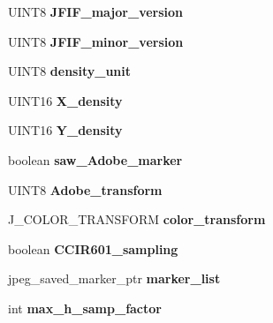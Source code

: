 \begin{DoxyCompactItemize}
U\+I\+N\+T8 {\bfseries J\+F\+I\+F\+\_\+major\+\_\+version}
\item 
\mbox{\label{structjpeg__decompress__struct_a75a27a410717002a2ec2f339a9142824}} 
U\+I\+N\+T8 {\bfseries J\+F\+I\+F\+\_\+minor\+\_\+version}
\item 
\mbox{\label{structjpeg__decompress__struct_a8d4afa82a43e8a7452b5e4f8276bbdb7}} 
U\+I\+N\+T8 {\bfseries density\+\_\+unit}
\item 
\mbox{\label{structjpeg__decompress__struct_a69f0da1031f16c621438d123921ba745}} 
U\+I\+N\+T16 {\bfseries X\+\_\+density}
\item 
\mbox{\label{structjpeg__decompress__struct_a2bfa78f638ae718f6601fd64a3b9f7aa}} 
U\+I\+N\+T16 {\bfseries Y\+\_\+density}
\item 
\mbox{\label{structjpeg__decompress__struct_aa117f97eb92feac14f6f91b599f1928c}} 
boolean {\bfseries saw\+\_\+\+Adobe\+\_\+marker}
\item 
\mbox{\label{structjpeg__decompress__struct_aebe0766b99c4fbe0e8b2a78e5e91d107}} 
U\+I\+N\+T8 {\bfseries Adobe\+\_\+transform}
\item 
\mbox{\label{structjpeg__decompress__struct_a976c199570f66a35853ad08dac014bc3}} 
J\+\_\+\+C\+O\+L\+O\+R\+\_\+\+T\+R\+A\+N\+S\+F\+O\+RM {\bfseries color\+\_\+transform}
\item 
\mbox{\label{structjpeg__decompress__struct_a57c63b368b579dc76944fe6dba1ecc96}} 
boolean {\bfseries C\+C\+I\+R601\+\_\+sampling}
\item 
\mbox{\label{structjpeg__decompress__struct_a28761988a8f06e80619169e09412b27a}} 
jpeg\+\_\+saved\+\_\+marker\+\_\+ptr {\bfseries marker\+\_\+list}
\item 
\mbox{\label{structjpeg__decompress__struct_a3c7351d6faa7604cfc60ce3346aa64fa}} 
int {\bfseries max\+\_\+h\+\_\+samp\+\_\+factor}

\end{DoxyCompactItemize}
